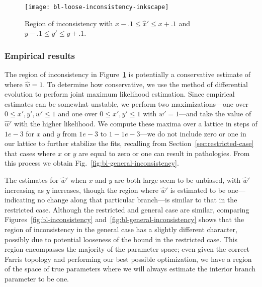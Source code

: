 \begin{figure}
\centering
\texttt{[image: bl-loose-inconsistency-inkscape]}
\caption{Region of inconsistency with $x-.1 \le \hat{x}' \le x+.1$ and $y-.1 \le \hat{y}' \le y+.1$.}
\label{fig:bl-loose-inconsistency}
\end{figure}

\subsubsection{Empirical results}

The region of inconsistency in Figure~\ref{fig:bl-loose-inconsistency} is potentially a conservative estimate of where $\hat{w}=1$.
To determine how conservative, we use the method of differential evolution \cite{Storn1997} to perform joint maximum likelihood estimation.
Since empirical estimates can be somewhat unstable, we perform two maximizations---one over $0 \le x',y',w' \le 1$ and one over $0 \le x',y' \le 1$ with $w'=1$---and take the value of $\hat{w}'$ with the higher likelihood.
We compute these maxima over a lattice in steps of $1e-3$ for $x$ and $y$ from $1e-3$ to $1-1e-3$---we do not include zero or one in our lattice to further stabilize the fits, recalling from Section~\ref{sec:restricted-case} that cases where $x$ or $y$ are equal to zero or one can result in pathologies.
From this process we obtain Fig.~\ref{fig:bl-general-inconsistency}.

The estimates for $\hat{w}'$ when $x$ and $y$ are both large seem to be unbiased, with $\hat{w}'$ increasing as $y$ increases, though the region where $\hat{w}'$ is estimated to be one---indicating no change along that particular branch---is similar to that in the restricted case.
Although the restricted and general case are similar, comparing Figures~\ref{fig:bl-inconsistency} and~\ref{fig:bl-general-inconsistency} shows that the region of inconsistency in the general case has a slightly different character, possibly due to potential looseness of the bound in the restricted case.
This region encompasses the majority of the parameter space; even given the correct Farris topology and performing our best possible optimization, we have a region of the space of true parameters where we will always estimate the interior branch parameter to be one.

